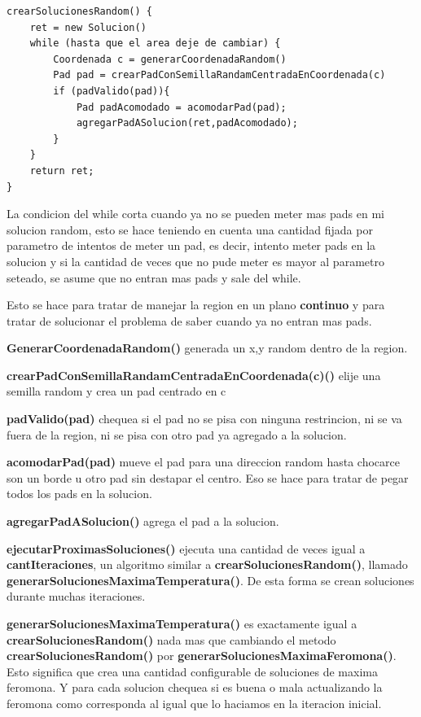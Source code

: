 \begin{verbatim}	
crearSolucionesRandom() {
    ret = new Solucion()
    while (hasta que el area deje de cambiar) {
        Coordenada c = generarCoordenadaRandom()
        Pad pad = crearPadConSemillaRandamCentradaEnCoordenada(c)
        if (padValido(pad)){
            Pad padAcomodado = acomodarPad(pad);
            agregarPadASolucion(ret,padAcomodado);
        }
    }
    return ret;
}
\end{verbatim}	

La condicion del while corta cuando ya no se pueden meter mas pads en mi solucion random, esto se hace teniendo en cuenta una cantidad fijada por parametro de intentos de meter un pad, es decir, intento meter pads en la solucion y si la cantidad de veces que no pude meter es mayor al parametro seteado, se asume que no entran mas pads y sale del while. 

Esto se hace para tratar de manejar la region en un plano \textbf{continuo} y para tratar de solucionar el problema de saber cuando ya no entran mas pads.

\textbf{GenerarCoordenadaRandom()} generada un x,y random dentro de la region. 

\textbf{crearPadConSemillaRandamCentradaEnCoordenada(c)()} elije una semilla random y crea un pad centrado en c

\textbf{padValido(pad)} chequea si el pad no se pisa con ninguna restrincion, ni se va fuera de la region, ni se pisa con otro pad ya agregado a la solucion.

\textbf{acomodarPad(pad)} mueve el pad para una direccion random hasta chocarce son un borde u otro pad sin destapar el centro. Eso se hace para tratar de pegar todos los pads en la solucion.

\textbf{agregarPadASolucion()} agrega el pad a la solucion.

\textbf{ejecutarProximasSoluciones()} ejecuta una cantidad de veces igual a \textbf{cantIteraciones}, un algoritmo similar a \textbf{crearSolucionesRandom()}, llamado \textbf{generarSolucionesMaximaTemperatura()}. De esta forma se crean soluciones durante muchas iteraciones.

\textbf{generarSolucionesMaximaTemperatura()} es exactamente igual a \textbf{crearSolucionesRandom()} nada mas que cambiando el metodo \textbf{crearSolucionesRandom()} por \textbf{generarSolucionesMaximaFeromona()}. Esto significa que crea una cantidad configurable de soluciones de maxima feromona. Y para cada solucion chequea si es buena o mala actualizando la feromona como corresponda al igual que lo haciamos en la iteracion inicial.

